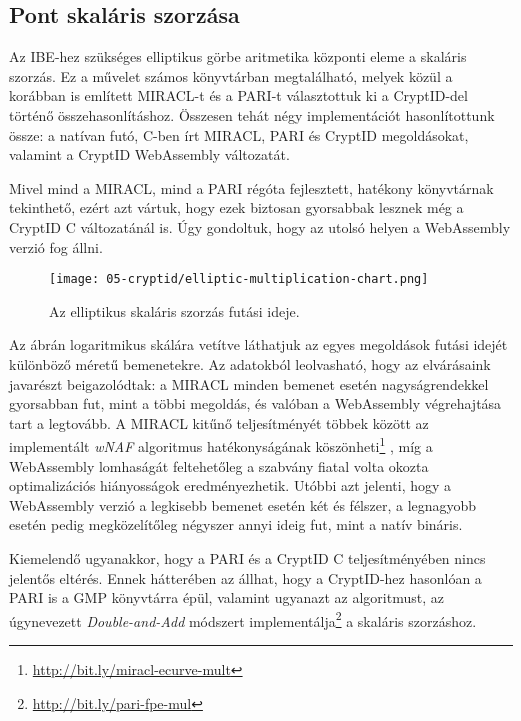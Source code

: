 \subsection{Pont skaláris szorzása}

Az IBE-hez szükséges elliptikus görbe aritmetika központi eleme a skaláris szorzás. Ez a művelet számos könyvtárban megtalálható, melyek közül a korábban is említett MIRACL-t és a PARI-t választottuk ki a CryptID-del történő összehasonlításhoz. Összesen tehát négy implementációt hasonlítottunk össze: a natívan futó, C-ben írt MIRACL, PARI és CryptID megoldásokat, valamint a CryptID WebAssembly változatát.

Mivel mind a MIRACL, mind a PARI régóta fejlesztett, hatékony könyvtárnak tekinthető, ezért azt vártuk, hogy ezek biztosan gyorsabbak lesznek még a CryptID C változatánál is. Úgy gondoltuk, hogy az utolsó helyen a WebAssembly verzió fog állni.

\begin{figure}[h]
    \centering
    \texttt{[image: 05-cryptid/elliptic-multiplication-chart.png]}
    \caption{Az elliptikus skaláris szorzás futási ideje.}
    \label{Figure::CryptID::EllipticMultiplicationChart}
\end{figure}

Az  ábrán logaritmikus skálára vetítve láthatjuk az egyes megoldások futási idejét különböző méretű bemenetekre. Az adatokból leolvasható, hogy az elvárásaink javarészt beigazolódtak: a MIRACL minden bemenet esetén nagyságrendekkel gyorsabban fut, mint a többi megoldás, és valóban a WebAssembly végrehajtása tart a legtovább. A MIRACL kitűnő teljesítményét többek között az implementált \textit{wNAF} algoritmus hatékonyságának köszönheti\footnote{\url{http://bit.ly/miracl-ecurve-mult}} \cite{ECCScalarMultiplicationAnalysis}, míg a WebAssembly lomhaságát feltehetőleg a szabvány fiatal volta okozta optimalizációs hiányosságok eredményezhetik. Utóbbi azt jelenti, hogy a WebAssembly verzió a legkisebb bemenet esetén két és félszer, a legnagyobb esetén pedig megközelítőleg négyszer annyi ideig fut, mint a natív bináris.

Kiemelendő ugyanakkor, hogy a PARI és a CryptID C teljesítményében nincs jelentős eltérés. Ennek hátterében az állhat, hogy a CryptID-hez hasonlóan a PARI is a GMP könyvtárra épül, valamint ugyanazt az algoritmust, az úgynevezett \textit{Double-and-Add} módszert implementálja\footnote{\url{http://bit.ly/pari-fpe-mul}} a skaláris szorzáshoz.

